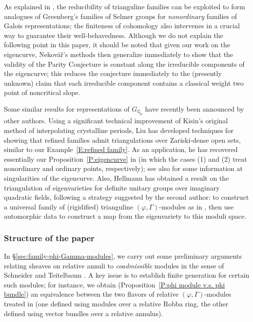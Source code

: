 \documentclass[12pt]{article}
\theoremstyle{definition}
\numberwithin{equation}{theorem}
\newcommand{\QQ}{\mathbb{Q}}
\def\Qp{\QQ_p}
\begin{document}
As explained in \cite{pottharst1}, the reducibility of trianguline
families can be exploited to form analogues of Greenberg's families of
Selmer groups for \emph{nonordinary} families of Galois
representations; the finiteness of cohomology also intervenes in a
crucial way to guarantee their well-behavedness.  Although we do not
explain the following point in this paper, it should be noted that
given our work on the eigencurve, Nekov\'a\v{r}'s methods then
generalize immediately to show that the validity of the Parity
Conjecture is constant along the irreducible components of the
eigencurve; this reduces the conjecture immediately to the (presently
unknown) claim that each irreducible component contains a classical
weight two point of noncritical slope.

Some similar results for representations of $G_{\Qp}$ have recently
been announced by other authors.  Using a significant technical
improvement of Kisin's original method \cite{R:Kisin} of interpolating
crystalline periods, Liu has developed techniques for showing that
refined families admit triangulations over Zariski-dense open sets,
similar to our Example~\ref{E:refined family}.  As an application, he
has recovered essentially our Proposition~\ref{P:eigencurve} in
\cite[Proposition~5.4.2]{R:Liu2} (in which the cases (1) and (2) treat
nonordinary and ordinary points, respectively); see also
\cite[Theorem~5.4.3]{R:Liu2} for some information at singularities of
the eigencurve.  Also, Hellmann \cite[Corollary~1.5]{hellmann} has
obtained a result on the triangulation of eigenvarieties for definite
unitary groups over imaginary quadratic fields, following a strategy
suggested by the second author: to construct a universal family of
(rigidified) trianguline $(\varphi,\Gamma)$-modules as in
\cite{chenevier}, then use automorphic data to construct a map from
the eigenvariety to this moduli space.

\subsubsection*{Structure of the paper}

In \S\ref{sec:family-phi-Gamma-modules}, we carry out some preliminary
arguments
relating sheaves on relative annuli to \emph{coadmissible} modules in
the sense of Schneider and Teitelbaum
\cite{schneider-teitelbaum}. A key issue is to establish finite
generation for certain such modules;
for instance, we obtain (Proposition~\ref{P:phi module v.s. phi bundle})
an equivalence between the two flavors of relative $(\varphi,
\Gamma)$-modules
treated in \cite{kiran-liu} (one defined using modules over a relative
Robba ring, the other defined using vector bundles over a relative
annulus).
\end{document}
